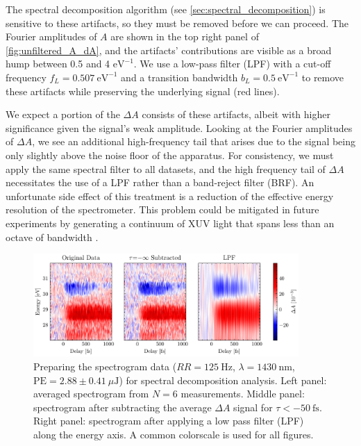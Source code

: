 The spectral decomposition algorithm (see \cref{sec:spectral_decomposition}) is sensitive to these artifacts, so they must be removed before we can proceed. The Fourier amplitudes of $A$ are shown in the top right panel of \cref{fig:unfiltered_A_dA}, and the artifacts' contributions are visible as a broad hump between 0.5 and 4 $\textrm{eV}^{-1}$. We use a low-pass filter (LPF) with a cut-off frequency $f_L = 0.507 \ \textrm{eV}^{-1}$ and a transition bandwidth $b_L = 0.5 \ \textrm{eV}^{-1}$ to remove these artifacts while preserving the underlying signal (red lines).

We expect a portion of the $\Delta A$ consists of these artifacts, albeit with higher significance given the signal's weak amplitude. Looking at the Fourier amplitudes of $\Delta A$, we see an additional high-frequency tail that arises due to the signal being only slightly above the noise floor of the apparatus. For consistency, we must apply the same spectral filter to all datasets, and the high frequency tail of $\Delta A$ necessitates the use of a LPF rather than a band-reject filter (BRF). An unfortunate side effect of this treatment is a reduction of the effective energy resolution of the spectrometer. This problem could be mitigated in future experiments by generating a continuum of XUV light that spans less than an octave of bandwidth \cite{zurchDirectSimultaneousObservation2017}.

\begin{figure}
	\centering
	\includegraphics[width=0.9\textwidth]{figures/chap4/orig_sub_filt_spectrogram.pdf}
	\caption{Preparing the spectrogram data ($RR = 125 \ \textrm{Hz}$, $\lambda = 1430 \ \textrm{nm}$, $\textrm{PE}=2.88 \pm 0.41 \ \mu\textrm{J}$) for spectral decomposition analysis. Left panel: averaged spectrogram from $N=6$ measurements. Middle panel: spectrogram after subtracting the average $\Delta A$ signal for $\tau < - 50 \ \textrm{fs}$. Right panel: spectrogram after applying a low pass filter (LPF) along the energy axis. A common colorscale is used for all figures.}
	\label{fig:orig_sub_filt_spectrogram}
\end{figure}


